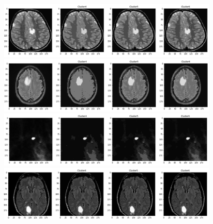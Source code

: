 \documentclass{article}
\begin{document}
\begin{figure}[h!]
\centerline{\includegraphics[scale=0.45]{images/segmented_fuzzy_c_means9.png}}
\centerline{ \includegraphics[scale=0.45]{images/segmented_fuzzy_c_means11.png}}
\centerline{\includegraphics[scale=0.45]{images/segmented_fuzzy_c_means12.png}}
\centerline{\includegraphics[scale=0.45]{images/segmented_fuzzy_c_means13.png}}
\end{figure}

\newpage
\end{document}
